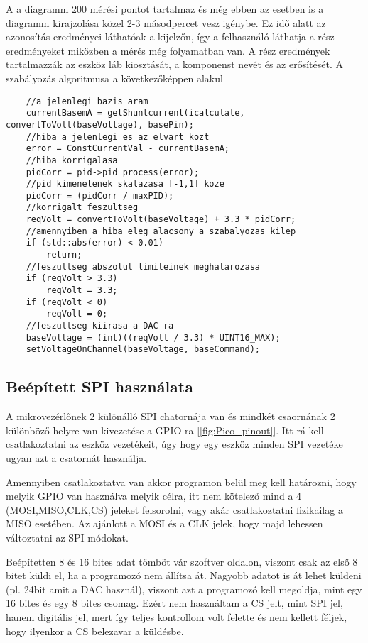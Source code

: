 A a diagramm 200 mérési pontot tartalmaz és még ebben az esetben is a 
diagramm kirajzolása közel 2-3 másodpercet vesz igénybe. Ez idő alatt 
az azonosítás eredményei láthatóak a kijelzőn, így a felhasználó láthatja
a rész eredményeket miközben a mérés még folyamatban van. 
A rész eredmények tartalmazzák az eszköz láb kiosztását, a komponenst
nevét és az erősítését. A szabályozás algoritmusa a következőképpen
alakul

\begin{lstlisting}
    //a jelenlegi bazis aram
    currentBasemA = getShuntcurrent(icalculate, convertToVolt(baseVoltage), basePin);
    //hiba a jelenlegi es az elvart kozt
    error = ConstCurrentVal - currentBasemA;
    //hiba korrigalasa
    pidCorr = pid->pid_process(error);
    //pid kimenetenek skalazasa [-1,1] koze
    pidCorr = (pidCorr / maxPID);
    //korrigalt feszultseg
    reqVolt = convertToVolt(baseVoltage) + 3.3 * pidCorr;
    //amennyiben a hiba eleg alacsony a szabalyozas kilep
    if (std::abs(error) < 0.01)
        return;
    //feszultseg abszolut limiteinek meghatarozasa    
    if (reqVolt > 3.3)
        reqVolt = 3.3;
    if (reqVolt < 0)
        reqVolt = 0;
    //feszultseg kiirasa a DAC-ra
    baseVoltage = (int)((reqVolt / 3.3) * UINT16_MAX);
    setVoltageOnChannel(baseVoltage, baseCommand);
\end{lstlisting}

\subsection{Beépített SPI használata}

A mikrovezérlőnek 2 különálló SPI chatornája van és mindkét csaornának 2 különböző
helyre van kivezetése a GPIO-ra [\ref{fig:Pico_pinout}]. Itt rá kell csatlakoztatni az eszköz vezetékeit, úgy
hogy egy eszköz minden SPI vezetéke ugyan azt a csatornát használja.

Amennyiben csatlakoztatva van akkor programon belül meg kell határozni, hogy 
melyik GPIO van használva melyik célra, itt nem kötelező mind a 4 (MOSI,MISO,CLK,CS)
jeleket felsorolni, vagy akár csatlakoztatni fizikailag a MISO esetében. Az 
ajánlott a MOSI és a CLK jelek, hogy majd lehessen változtatni az SPI módokat.

Beépítetten 8 és 16 bites adat tömböt vár szoftver oldalon, viszont csak az első
8 bitet küldi el, ha a programozó nem állítsa át. Nagyobb adatot is át lehet 
küldeni (pl. 24bit amit a DAC használ), viszont azt a programozó kell megoldja,
mint egy 16 bites és egy 8 bites csomag. Ezért nem használtam a CS jelt, mint 
SPI jel, hanem digitális jel, mert így teljes kontrollom volt felette és nem 
kellett féljek, hogy ilyenkor a CS belezavar a küldésbe.


